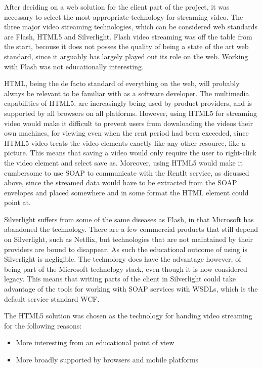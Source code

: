 After deciding on a web solution for the client part of the project, it was necessary to select the most appropriate technology for streaming video. The three major video streaming technologies, which can be considered web standards are Flash, HTML5 and Silverlight.
Flash video streaming was off the table from the start, becouse it does not posses the quality of being a state of the art web standard, since it arguably has largely played out its role on the web. Working with Flash was not educationally interesting.

HTML, being the de facto standard of everything on the web, will probably always be relevant to be familiar with as a software developer. The multimedia capabilities of HTML5, are increasingly being used by product providers, and is supported by all browsers on all platforms. However, using HTML5 for streaming video would make it difficult to prevent users from downloading the videos their own machines, for viewing even when the rent period had been exceeded, since HTML5 video treats the video elements exactly like any other resource, like a picture. This means that saving a video would only require the user to right-click the video element and select save as. Moreover, using HTML5 would make it cumbersome to use SOAP to communicate with the RentIt service, as dicussed above, since the streamed data would have to be extracted from the SOAP envelopes and placed somewhere and in some format the HTML element could point at.

Silverlight suffers from some of the same diseases as Flash, in that Microsoft has abandoned the technology. There are a few commercial products that still depend on Silverlight, such as Netflix, but technologies that are not maintained by their providers are bound to disappear. As such the educational outcome of using is Silverlight is negligible. The technology does have the advantage however, of being part of the Microsoft technology stack, even though it is now considered legacy. This means that writing parts of the client in Silverlight could take advantage of the tools for working with SOAP services with WSDLs, which is the default service standard WCF.

The HTML5 solution was chosen as the technology for handing video streaming for the following reasons:
\begin{itemize}
\item More interesting from an educational point of view
\item More broadly supported by browsers and mobile platforms
\end{itemize}

